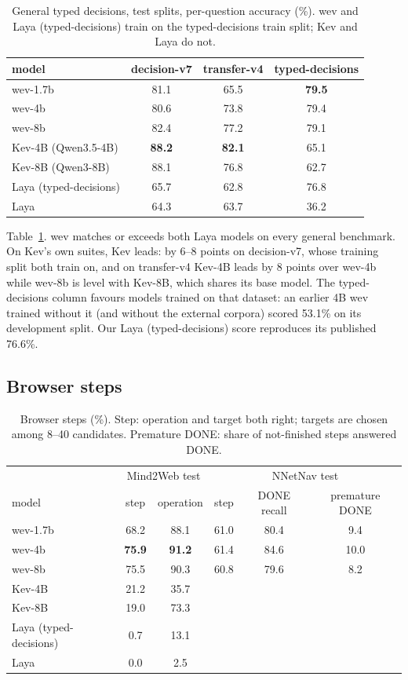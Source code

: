 \documentclass[11pt]{article}
\begin{document}
\begin{table}[t]
\centering\small
\begin{tabular}{lccc}
\toprule
model & decision-v7 & transfer-v4 & typed-decisions \\
\midrule
wev-1.7b & 81.1 & 65.5 & \textbf{79.5} \\
wev-4b & 80.6 & 73.8 & 79.4 \\
wev-8b & 82.4 & 77.2 & 79.1 \\
\midrule
Kev-4B (Qwen3.5-4B) & \textbf{88.2} & \textbf{82.1} & 65.1 \\
Kev-8B (Qwen3-8B) & 88.1 & 76.8 & 62.7 \\
Laya (typed-decisions) & 65.7 & 62.8 & 76.8 \\
Laya & 64.3 & 63.7 & 36.2 \\
\bottomrule
\end{tabular}
\caption{General typed decisions, test splits, per-question accuracy (\%). wev and Laya (typed-decisions) train on the
typed-decisions train split; Kev and Laya do not.}
\label{tab:general}
\end{table}

Table~\ref{tab:general}. wev matches or exceeds both Laya models on every general benchmark. On Kev's own suites, Kev
leads: by 6--8 points on decision-v7, whose training split both train on, and on transfer-v4 Kev-4B leads by 8 points
over wev-4b while wev-8b is level with Kev-8B, which shares its base model. The typed-decisions column favours models
trained on that dataset: an earlier 4B wev trained without it (and without the external corpora) scored 53.1\% on its
development split. Our Laya (typed-decisions) score reproduces its published 76.6\%.

\subsection{Browser steps}
\label{sec:browser}

\begin{table}[t]
\centering\small
\begin{tabular}{lcc@{\hskip 2em}ccc}
\toprule
& \multicolumn{2}{c}{Mind2Web test} & \multicolumn{3}{c}{NNetNav test} \\
model & step & operation & step & DONE recall & premature DONE \\
\midrule
wev-1.7b & 68.2 & 88.1 & 61.0 & 80.4 & 9.4 \\
wev-4b & \textbf{75.9} & \textbf{91.2} & 61.4 & 84.6 & 10.0 \\
wev-8b & 75.5 & 90.3 & 60.8 & 79.6 & 8.2 \\
\midrule
Kev-4B & 21.2 & 35.7 & & & \\
Kev-8B & 19.0 & 73.3 & & & \\
Laya (typed-decisions) & 0.7 & 13.1 & & & \\
Laya & 0.0 & 2.5 & & & \\
\bottomrule
\end{tabular}
\caption{Browser steps (\%). Step: operation and target both right; targets are chosen among 8--40 candidates.
Premature DONE: share of not-finished steps answered DONE.}
\label{tab:browser}
\end{table}
\end{document}
